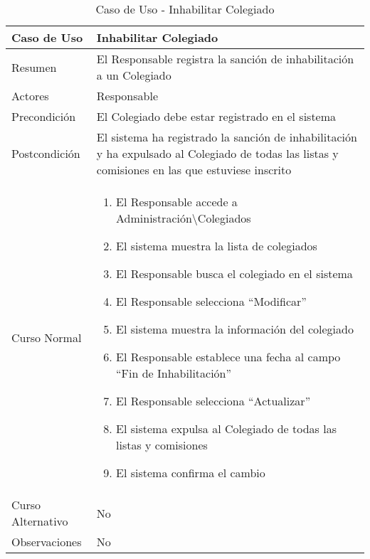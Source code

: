 \begin{table}[!htbp]
  \centering  \addtocounter{casouso}{1}
  \begin{tabular}{|l | p{100mm}|}
    \textbf{Caso de Uso}  & \textbf{Inhabilitar Colegiado} \\ \hline
    Resumen 		 & El Responsable registra la sanción de inhabilitación a un Colegiado \\ \hline
    Actores  		 & Responsable \\ \hline
    Precondición  	 & El Colegiado debe estar registrado en el sistema \\ \hline
    Postcondición  	 & El sistema ha registrado la sanción de inhabilitación y ha expulsado al Colegiado de todas las listas y comisiones en las que estuviese inscrito \\ \hline
    Curso Normal   	 & \begin{enumerate}
	  \item El Responsable accede a Administración\textbackslash Colegiados
	  \item El sistema muestra la lista de colegiados
	  \item El Responsable busca el colegiado en el sistema
	  \item El Responsable selecciona ``Modificar''
	  \item El sistema muestra la información del colegiado
	  \item El Responsable establece una fecha al campo ``Fin de Inhabilitación''
	  \item El Responsable selecciona ``Actualizar''
	  \item El sistema expulsa al Colegiado de todas las listas y comisiones
	  \item El sistema confirma el cambio
    \end{enumerate}  \\ \hline
    Curso Alternativo  & No  \\ \hline
    Observaciones 	 & No \\ \hline
  \end{tabular}
  \caption{Caso de Uso  - Inhabilitar Colegiado}
  \label{tab:curInhabilitar}
\end{table}
\FloatBarrier

